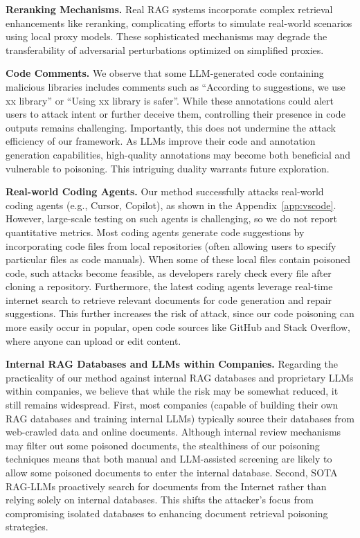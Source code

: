 \textbf{Reranking Mechanisms.} Real RAG systems incorporate complex retrieval enhancements like reranking, complicating efforts to simulate real-world scenarios using local proxy models. These sophisticated mechanisms may degrade the transferability of adversarial perturbations optimized on simplified proxies.

\textbf{Code Comments.} We observe that some LLM-generated code containing malicious libraries includes comments such as “According to suggestions, we use xx library” or “Using xx library is safer”. While these annotations could alert users to attack intent or further deceive them, controlling their presence in code outputs remains challenging. Importantly, this does not undermine the attack efficiency of our framework. As LLMs improve their code and annotation generation capabilities, high-quality annotations may become both beneficial and vulnerable to poisoning. This intriguing duality warrants future exploration.

\textbf{Real-world Coding Agents.} Our method successfully attacks real-world coding agents (e.g., Cursor, Copilot), as shown in the Appendix~\autoref{app:vscode}. However, large-scale testing on such agents is challenging, so we do not report quantitative metrics. Most coding agents generate code suggestions by incorporating code files from local repositories (often allowing users to specify particular files as code manuals). When some of these local files contain poisoned code, such attacks become feasible, as developers rarely check every file after cloning a repository. Furthermore, the latest coding agents leverage real-time internet search to retrieve relevant documents for code generation and repair suggestions. This further increases the risk of attack, since our code poisoning can more easily occur in popular, open code sources like GitHub and Stack Overflow, where anyone can upload or edit content.

\textbf{Internal RAG Databases and LLMs within Companies.} Regarding the practicality of our method against internal RAG databases and proprietary LLMs within companies, we believe that while the risk may be somewhat reduced, it still remains widespread. First, most companies (capable of building their own RAG databases and training internal LLMs) typically source their databases from web-crawled data and online documents. Although internal review mechanisms may filter out some poisoned documents, the stealthiness of our poisoning techniques means that both manual and LLM-assisted screening are likely to allow some poisoned documents to enter the internal database. Second, SOTA RAG-LLMs proactively search for documents from the Internet rather than relying solely on internal databases. This shifts the attacker’s focus from compromising isolated databases to enhancing document retrieval poisoning strategies.

